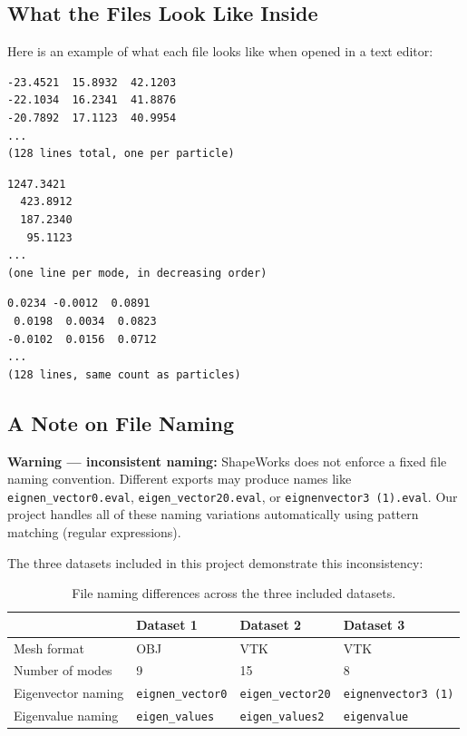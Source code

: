 \documentclass[12pt,a4paper]{article}
\begin{document}
\subsection{What the Files Look Like Inside}

Here is an example of what each file looks like when opened in a text editor:

\begin{lstlisting}[title={\textbf{particles.particles} (128 particles, 3 coordinates each)}]
-23.4521  15.8932  42.1203
-22.1034  16.2341  41.8876
-20.7892  17.1123  40.9954
...
(128 lines total, one per particle)
\end{lstlisting}

\begin{lstlisting}[title={\textbf{eigen\_values.eval} (one eigenvalue per mode)}]
1247.3421
  423.8912
  187.2340
   95.1123
...
(one line per mode, in decreasing order)
\end{lstlisting}

\begin{lstlisting}[title={\textbf{eigenvector0.eval} (displacement for each particle in Mode 0)}]
 0.0234 -0.0012  0.0891
 0.0198  0.0034  0.0823
-0.0102  0.0156  0.0712
...
(128 lines, same count as particles)
\end{lstlisting}

\subsection{A Note on File Naming}

\begin{mdframed}[backgroundcolor=codegray, linecolor=warnred, linewidth=1.5pt]
\textbf{Warning --- inconsistent naming:} ShapeWorks does not enforce a fixed file naming convention. Different exports may produce names like \texttt{eignen\_vector0.eval}, \texttt{eigen\_vector20.eval}, or \texttt{eignenvector3 (1).eval}. Our project handles all of these naming variations automatically using pattern matching (regular expressions).
\end{mdframed}

The three datasets included in this project demonstrate this inconsistency:

\begin{table}[H]
\centering
\renewcommand{\arraystretch}{1.3}
\begin{tabular}{@{}llll@{}}
\toprule
& \textbf{Dataset 1} & \textbf{Dataset 2} & \textbf{Dataset 3} \\
\midrule
Mesh format & OBJ & VTK & VTK \\
Number of modes & 9 & 15 & 8 \\
Eigenvector naming & \texttt{eignen\_vector0} & \texttt{eigen\_vector20} & \texttt{eignenvector3 (1)} \\
Eigenvalue naming & \texttt{eigen\_values} & \texttt{eigen\_values2} & \texttt{eigenvalue} \\
\bottomrule
\end{tabular}
\caption{File naming differences across the three included datasets.}
\label{tab:naming}
\end{table}
\end{document}
